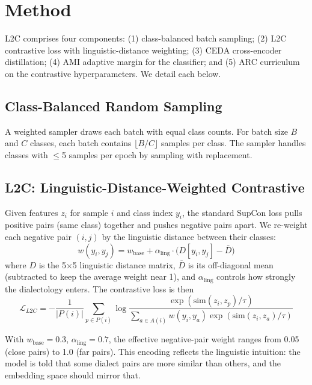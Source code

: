 \documentclass[11pt,a4paper,twocolumn]{article}
\newcommand{\method}{L2C}
\newcommand{\ceda}{CEDA}
\newcommand{\ami}{AMI}
\newcommand{\arc}{ARC}
\begin{document}
\section{Method}
\label{sec:method}

\method{} comprises four components: (1) class-balanced batch
sampling; (2) \method{} contrastive loss with linguistic-distance
weighting; (3) \ceda{} cross-encoder distillation; (4) \ami{}
adaptive margin for the classifier; and (5) \arc{} curriculum on
the contrastive hyperparameters. We detail each below.

\subsection{Class-Balanced Random Sampling}
A weighted sampler draws each batch with equal class counts. For
batch size $B$ and $C$ classes, each batch contains $\lfloor B/C\rfloor$
samples per class. The sampler handles classes with $\le$5 samples
per epoch by sampling with replacement.

\subsection{\method{}: Linguistic-Distance-Weighted Contrastive}
Given features $z_i$ for sample $i$ and class index $y_i$, the
standard SupCon loss pulls positive pairs (same class) together and
pushes negative pairs apart. We re-weight each negative pair
$(i,j)$ by the linguistic distance between their classes:
\begin{equation}
w(y_i,y_j) = w_{\text{base}} + \alpha_{\text{ling}} \cdot \bigl(D[y_i,y_j] - \bar{D}\bigr)
\label{eq:l2c}
\end{equation}
where $D$ is the 5$\times$5 linguistic distance matrix,
$\bar{D}$ is its off-diagonal mean (subtracted to keep the average
weight near 1), and $\alpha_{\text{ling}}$ controls how strongly the
dialectology enters. The contrastive loss is then
\begin{equation}
\mathcal{L}_{\method{}} = -\frac{1}{|P(i)|}\sum_{p\in P(i)}
\log\frac{\exp(\mathrm{sim}(z_i,z_p)/\tau)}
{\sum_{a\in A(i)} w(y_i,y_a)\exp(\mathrm{sim}(z_i,z_a)/\tau)}
\label{eq:l2c_full}
\end{equation}

With $w_{\text{base}}=0.3$, $\alpha_{\text{ling}}=0.7$, the effective
negative-pair weight ranges from 0.05 (close pairs) to 1.0 (far pairs).
This encoding reflects the linguistic intuition: the model is told
that some dialect pairs are more similar than others, and the
embedding space should mirror that.
\end{document}
